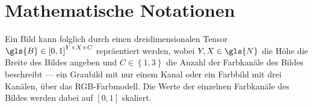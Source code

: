 \section{Mathematische Notationen}
\label{mathematische_notationen}



Ein Bild kann folglich durch einen dreidimensionalen Tensor $\gls{B} \in {\left[0, 1\right]}^{Y \times X \times C}$ repräentiert werden, wobei $Y, X \in \gls{N}$ die Höhe \bzw{} die Breite des Bildes angeben und $C \in \left\{1, 3\right\}$ die Anzahl der Farbkanäle des Bildes beschreibt — ein Graubild mit nur einem Kanal oder ein Farbbild mit drei Kanälen, \zB{} über das RGB-Farbmodell.
Die Werte der einzelnen Farbkanäle des Bildes werden dabei auf $\left[0, 1\right]$ skaliert.
